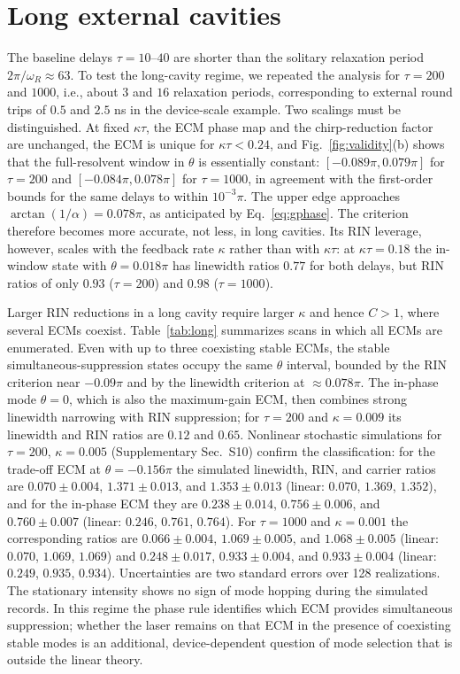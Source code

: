 \documentclass{optica-article}
\newif\ifmarked
\newenvironment{revised}{\ifmarked\color{blue}\fi}{}
\begin{document}
\begin{revised}
\section{Long external cavities}
\label{sec:long}

The baseline delays $\tau=10$--$40$ are shorter than the solitary relaxation period $2\pi/\omega_R\approx63$. To test the long-cavity regime, we repeated the analysis for $\tau=200$ and $1000$, i.e., about $3$ and $16$ relaxation periods, corresponding to external round trips of $0.5$ and $2.5$ ns in the device-scale example. Two scalings must be distinguished. At fixed $\kappa\tau$, the ECM phase map and the chirp-reduction factor are unchanged, the ECM is unique for $\kappa\tau<0.24$, and Fig.~\ref{fig:validity}(b) shows that the full-resolvent window in $\theta$ is essentially constant: $[-0.089\pi,0.079\pi]$ for $\tau=200$ and $[-0.084\pi,0.078\pi]$ for $\tau=1000$, in agreement with the first-order bounds for the same delays to within $10^{-3}\pi$. The upper edge approaches $\arctan(1/\alpha)=0.078\pi$, as anticipated by Eq.~\eqref{eq:gphase}. The criterion therefore becomes more accurate, not less, in long cavities. Its RIN leverage, however, scales with the feedback rate $\kappa$ rather than with $\kappa\tau$: at $\kappa\tau=0.18$ the in-window state with $\theta=0.018\pi$ has linewidth ratios $0.77$ for both delays, but RIN ratios of only $0.93$ ($\tau=200$) and $0.98$ ($\tau=1000$).

Larger RIN reductions in a long cavity require larger $\kappa$ and hence $C>1$, where several ECMs coexist. Table~\ref{tab:long} summarizes scans in which all ECMs are enumerated. Even with up to three coexisting stable ECMs, the stable simultaneous-suppression states occupy the same $\theta$ interval, bounded by the RIN criterion near $-0.09\pi$ and by the linewidth criterion at $\approx0.078\pi$. The in-phase mode $\theta=0$, which is also the maximum-gain ECM, then combines strong linewidth narrowing with RIN suppression; for $\tau=200$ and $\kappa=0.009$ its linewidth and RIN ratios are $0.12$ and $0.65$. Nonlinear stochastic simulations for $\tau=200$, $\kappa=0.005$ (Supplementary Sec.~S10) confirm the classification: for the trade-off ECM at $\theta=-0.156\pi$ the simulated linewidth, RIN, and carrier ratios are $0.070\pm0.004$, $1.371\pm0.013$, and $1.353\pm0.013$ (linear: $0.070$, $1.369$, $1.352$), and for the in-phase ECM they are $0.238\pm0.014$, $0.756\pm0.006$, and $0.760\pm0.007$ (linear: $0.246$, $0.761$, $0.764$). For $\tau=1000$ and $\kappa=0.001$ the corresponding ratios are $0.066\pm0.004$, $1.069\pm0.005$, and $1.068\pm0.005$ (linear: $0.070$, $1.069$, $1.069$) and $0.248\pm0.017$, $0.933\pm0.004$, and $0.933\pm0.004$ (linear: $0.249$, $0.935$, $0.934$). Uncertainties are two standard errors over 128 realizations. The stationary intensity shows no sign of mode hopping during the simulated records. In this regime the phase rule identifies which ECM provides simultaneous suppression; whether the laser remains on that ECM in the presence of coexisting stable modes is an additional, device-dependent question of mode selection that is outside the linear theory.


\end{revised}
\end{document}
